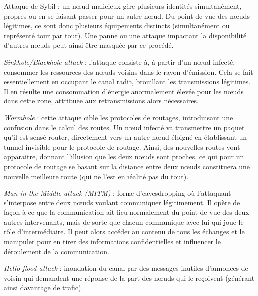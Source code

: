 \documentclass[]{article}
\begin{document}
\par Attaque de Sybil : un nœud malicieux gère plusieurs identités simultanément, propres ou en se faisant passer pour un autre nœud. Du point de vue des nœuds légitimes, ce sont donc plusieurs équipements distincts (simultanément ou représenté tour par tour). Une panne ou une attaque impactant la disponibilité d'autres nœuds peut ainsi être masquée par ce procédé.\\

\newpage

\par \textit{Sinkhole/Blackhole attack} : l'attaque consiste à, à partir d'un nœud infecté, consommer les ressources des nœuds voisins dans le rayon d'émission. Cela se fait essentiellement en occupant le canal radio, brouillant les transmissions légitimes. Il en résulte une consommation d'énergie anormalement élevée pour les nœuds dans cette zone, attribuée aux retransmissions alors nécessaires.\\

\par \textit{Wormhole} : cette attaque cible les protocoles de routages, introduisant une confusion dans le calcul des routes. Un nœud infecté va transmettre un paquet qu'il est sensé router, directement vers un autre nœud éloigné en établissant un tunnel invisible pour le protocole de routage. Ainsi, des nouvelles routes vont apparaitre, donnant l'illusion que les deux nœuds sont proches, ce qui pour un protocole de routage se basant sur la distance entre deux nœuds constituera une nouvelle meilleure route (qui ne l'est en réalité pas du tout).\\

\par \textit{Man-in-the-Middle attack (MITM)} : forme d'eavesdropping où l'attaquant s'interpose entre deux nœuds voulant communiquer légitimement. Il opère de façon à ce que la communication ait lieu normalement du point de vue des deux autres intervenants, mais de sorte que chacun communique avec lui qui joue le rôle d'intermédiaire. Il peut alors accéder au contenu de tous les échanges et le manipuler pour en tirer des informations confidentielles et influencer le déroulement de la communication.\\

\par \textit{Hello-flood attack} : inondation du canal par des messages inutiles d'annonces de voisin qui demandent une réponse de la part des nœuds qui le reçoivent (générant ainsi davantage de trafic).\\
\end{document}
